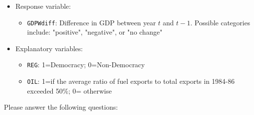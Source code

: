 \documentclass[12pt,letterpaper]{article}
\begin{document}
\begin{itemize}
	\item
	Response variable: 
	\begin{itemize}
		\item \texttt{GDPWdiff}: Difference in GDP between year $t$ and $t-1$. Possible categories include: "positive", "negative", or "no change"
	\end{itemize}
	\item
	Explanatory variables: 
	\begin{itemize}
		\item
		\texttt{REG}: 1=Democracy; 0=Non-Democracy
		\item
		\texttt{OIL}: 1=if the average ratio of fuel exports to total exports in 1984-86 exceeded 50\%; 0= otherwise
	\end{itemize}
	
\end{itemize}

\noindent Please answer the following questions:
\end{document}
